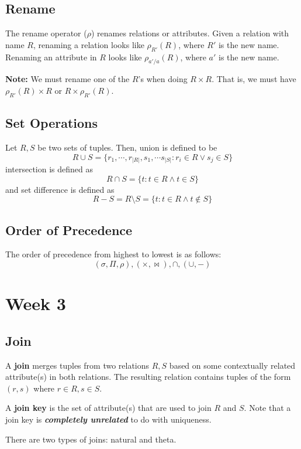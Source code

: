 \documentclass{report}
\newenvironment{definition}[1]{\begin{tcolorbox}[title={Definition: #1}]}{\end{tcolorbox}}
\renewcommand{\bf}[1]{\textbf{{#1}}}
\newcommand{\ib}[1]{\textit{\textbf{{#1}}}}
\begin{document}
\section{Rename}
\begin{definition}{Rename}
    The rename operator ($\rho$) renames relations or attributes. Given a relation with name $R$,
    renaming a relation looks like $\rho_{R'}(R)$, where $R'$ is the new name. Renaming an attribute
    in $R$ looks like $\rho_{a'/a}(R)$, where $a'$ is the new name. \vspace{10pt}
    
    \bf{Note:} We must rename one of the $R$'s when doing $R \times R$. That is, we must have
    $\rho_{R'}(R) \times R$ or $R \times \rho_{R'}(R)$.
\end{definition}

\section{Set Operations}
\begin{definition}{Set Operations (Union, Intersection, Set Difference)}
    Let $R, S$ be two sets of tuples. Then, union is defined to be
    \[R \cup S = \{ r_1, \cdots, r_{|R|}, s_1, \cdots s_{|S|} : r_i \in R \lor s_j \in S\}\]
    intersection is defined as
    \[R \cap S = \{ t : t \in R \land t \in S\}\]
    and set difference is defined as
    \[R - S = R \setminus S = \{ t : t \in R \land t \notin S\}\]
\end{definition}

\section{Order of Precedence}
The order of precedence from highest to lowest is as follows:
\[(\sigma, \Pi, \rho), (\times, \bowtie), \cap, (\cup, -)\]





\chapter{Week 3}
\section{Join}
\begin{definition}{Join}
    A \bf{join} merges tuples from two relations $R, S$ based on some contextually related
    attribute(s) in both relations. The resulting relation contains tuples of the form $(r, s)$
    where $r \in R, s \in S$. \vspace{12pt}

    A \bf{join key} is the set of attribute(s) that are used to join $R$ and $S$. Note that a join
    key is \ib{completely unrelated} to do with uniqueness.
\end{definition}
There are two types of joins: natural and theta.
\end{document}
